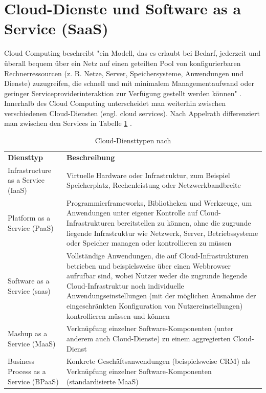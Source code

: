 \section{Cloud-Dienste und Software as a Service (SaaS)}\label{sec:SaaS}
Cloud Computing beschreibt "ein Modell, das es erlaubt bei Bedarf, jederzeit und überall bequem über ein Netz auf einen geteilten Pool von konfigurierbaren Rechnerressourcen (z. B. Netze, Server, Speichersysteme, Anwendungen und Dienste) zuzugreifen, die schnell und mit minimalem Managementaufwand oder geringer Serviceproviderinteraktion zur Verfügung gestellt werden können" \citep[S.~18]{appelrath_future_2014-1}. Innerhalb des Cloud Computing unterscheidet man weiterhin zwischen verschiedenen Cloud-Diensten (engl. cloud services). Nach Appelrath differenziert man zwischen den Services in Tabelle \ref{tab:CloudServices} \citep[S.~20]{appelrath_future_2014-1}.
\begin{table}[H]
\begin{tabular}{|p{5cm}|p{10cm}|}
\hline
\textbf{Diensttyp} & \textbf{Beschreibung}\\
\hhline{==}
Infrastructure as a Service (IaaS) & Virtuelle Hardware oder Infrastruktur, zum Beispiel Speicherplatz, Rechenleistung oder Netzwerkbandbreite\\
\hline
Platform as a Service (PaaS) & Programmierframeworks, Bibliotheken und Werkzeuge, um Anwendungen unter eigener Kontrolle auf
Cloud-Infrastrukturen bereitstellen zu können, ohne die zugrunde liegende Infrastruktur wie Netzwerk,
Server, Betriebssysteme oder Speicher managen oder kontrollieren zu müssen\\
\hline
Software as a Service (\gls{saas}) & Vollständige Anwendungen, die auf Cloud-Infrastrukturen betrieben und beispielsweise über einen
Webbrowser aufrufbar sind, wobei Nutzer weder die zugrunde liegende Cloud-Infrastruktur noch
individuelle Anwendungseinstellungen (mit der möglichen Ausnahme der eingeschränkten Konfiguration
von Nutzereinstellungen) kontrollieren müssen und können\\
\hline
Mashup as a Service (MaaS) & Verknüpfung einzelner Software-Komponenten (unter anderem auch Cloud-Dienste) zu einem aggregierten
Cloud-Dienst\\
\hline
Business Process as a Service (BPaaS) & Konkrete Geschäftsanwendungen (beispielsweise CRM) als Verknüpfung einzelner Software-Komponenten
(standardisierte MaaS)\\
\hline
\end{tabular}
\caption{Cloud-Diensttypen nach \citep[S.~20]{appelrath_future_2014-1}}
\label{tab:CloudServices}
\end{table}
